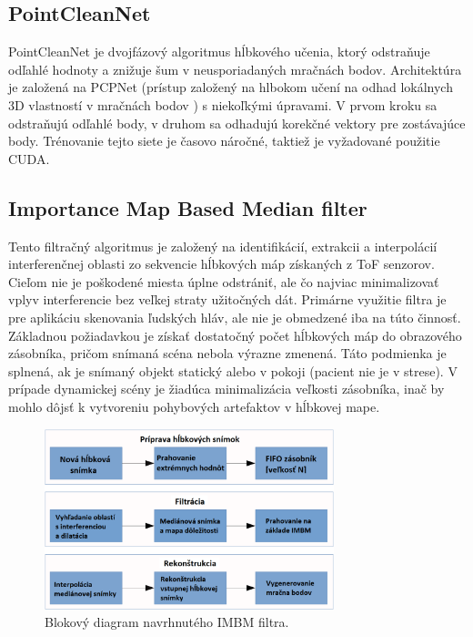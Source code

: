 \subsection{PointCleanNet}
PointCleanNet je dvojfázový algoritmus hĺbkového učenia, ktorý odstraňuje odľahlé hodnoty a znižuje šum v neusporiadaných mračnách bodov. Architektúra je založená na PCPNet (prístup založený na hlbokom učení na odhad lokálnych 3D vlastností v mračnách bodov \cite{Guerrero}) s niekoľkými úpravami. V prvom kroku sa odstraňujú odľahlé body, v druhom sa odhadujú korekčné vektory pre zostávajúce body. Trénovanie tejto siete je časovo náročné, taktiež je vyžadované použitie CUDA.

\subsection{Importance Map Based Median filter}

Tento filtračný algoritmus je založený na identifikácií, extrakcii a interpolácií interferenčnej oblasti zo sekvencie hĺbkových máp získaných z ToF senzorov. Cieľom nie je poškodené miesta úplne odstrániť, ale čo najviac minimalizovať vplyv interferencie bez veľkej straty užitočných dát. Primárne využitie filtra je pre aplikáciu skenovania ľudských hláv, ale nie je obmedzené iba na túto činnosť. Základnou požiadavkou je získať dostatočný počet hĺbkových máp do obrazového zásobníka, pričom snímaná scéna nebola výrazne zmenená. Táto podmienka je splnená, ak je snímaný objekt statický alebo v pokoji (pacient nie je v strese). V prípade dynamickej scény je žiadúca minimalizácia veľkosti zásobníka, inač by mohlo dôjsť k vytvoreniu pohybových artefaktov v hĺbkovej mape.

\begin{figure}[h]
	\centering
	\includegraphics[width=0.75\textwidth]{figures/algorithm.png}
	\caption{Blokový diagram navrhnutého IMBM filtra.}
	\label{fig:algorithm}
\end{figure}

